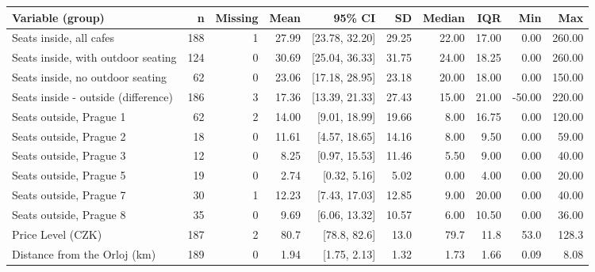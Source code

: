 \begin{tabular}{P{3.6cm}rrrrrrrrr}
  \toprule
Variable (group) & n & Missing & Mean & 95\% CI & SD & Median & IQR & Min & Max \\ 
  \midrule
Seats inside, all cafes & 188 &   1 & 27.99 & [23.78, 32.20] & 29.25 & 22.00 & 17.00 & 0.00 & 260.00 \\ 
  Seats inside, with outdoor seating & 124 &   0 & 30.69 & [25.04, 36.33] & 31.75 & 24.00 & 18.25 & 0.00 & 260.00 \\ 
  Seats inside, no outdoor seating &  62 &   0 & 23.06 & [17.18, 28.95] & 23.18 & 20.00 & 18.00 & 0.00 & 150.00 \\ 
  Seats inside - outside (difference) & 186 &   3 & 17.36 & [13.39, 21.33] & 27.43 & 15.00 & 21.00 & -50.00 & 220.00 \\ 
  Seats outside, Prague 1 &  62 &   2 & 14.00 & [9.01, 18.99] & 19.66 & 8.00 & 16.75 & 0.00 & 120.00 \\ 
  Seats outside, Prague 2 &  18 &   0 & 11.61 & [4.57, 18.65] & 14.16 & 8.00 & 9.50 & 0.00 & 59.00 \\ 
  Seats outside, Prague 3 &  12 &   0 & 8.25 & [0.97, 15.53] & 11.46 & 5.50 & 9.00 & 0.00 & 40.00 \\ 
  Seats outside, Prague 5 &  19 &   0 & 2.74 & [0.32, 5.16] & 5.02 & 0.00 & 4.00 & 0.00 & 20.00 \\ 
  Seats outside, Prague 7 &  30 &   1 & 12.23 & [7.43, 17.03] & 12.85 & 9.00 & 20.00 & 0.00 & 40.00 \\ 
  Seats outside, Prague 8 &  35 &   0 & 9.69 & [6.06, 13.32] & 10.57 & 6.00 & 10.50 & 0.00 & 36.00 \\ 
  Price Level (CZK) & 187 &   2 & 80.7 & [78.8, 82.6] & 13.0 & 79.7 & 11.8 & 53.0 & 128.3 \\ 
  Distance from the Orloj (km) & 189 &   0 & 1.94 & [1.75, 2.13] & 1.32 & 1.73 & 1.66 & 0.09 & 8.08 \\ 
   \bottomrule
\end{tabular}
